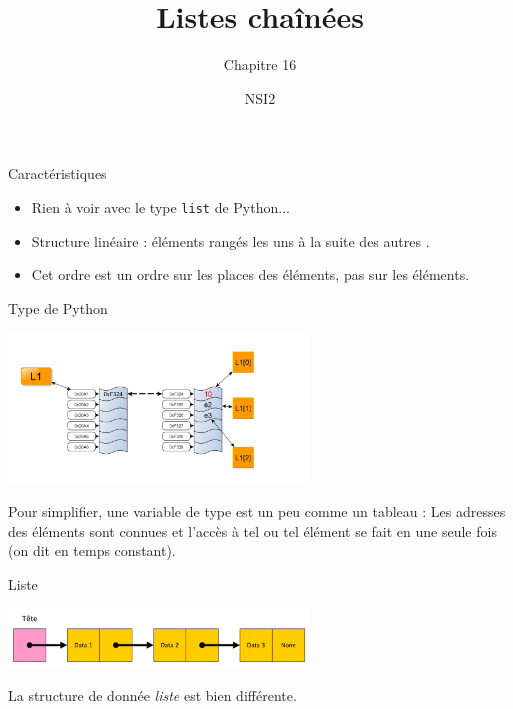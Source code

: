 \documentclass[10pt]{beamer}
\title{Listes chaînées}
\subtitle{Chapitre 16}
\author{NSI2}
\begin{document}
\maketitle

\begin{frame}{Caractéristiques}
	\begin{itemize}
		\item \alert{Rien à voir avec le type \texttt{list} de Python...}
		\item Structure linéaire : éléments rangés \og les uns à la suite des autres \fg.
		\item Cet ordre est un ordre \alert{sur les places} des éléments, pas sur les éléments.
	\end{itemize}
\end{frame}
\begin{frame}{Type  de Python}
    \begin{center}
        \includegraphics[width=8cm]{img/Liste}
    \end{center}
    Pour simplifier, une variable de type  est un peu comme un \alert{tableau} : Les adresses des éléments sont connues et l'accès à tel ou tel élément se fait en une seule fois (on dit \og en temps constant\fg{}).
\end{frame}
\begin{frame}{Liste}
    \begin{center}
    \includegraphics[width=8cm]{img/liste_chainee1}
\end{center}
La structure de donnée \textit{liste} est bien différente.
\end{frame}
\end{document}
